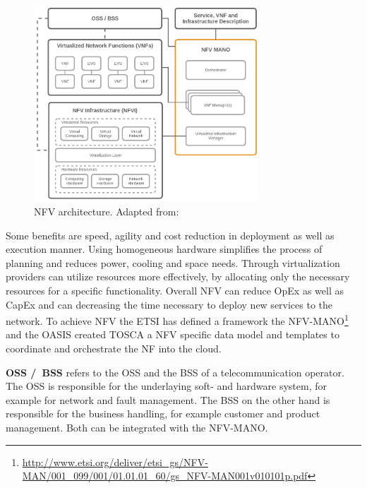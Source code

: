 \begin{figure}[H]
    \centering
    \includegraphics[width=0.75\textwidth]{resources/images/nfv_architecture.png}
    \caption[NFV architecture]{NFV architecture. Adapted from: \autocite{NFV:Architecture}}
    \label{fig:nfv_architecture}
\end{figure}

Some benefits are speed, agility and cost reduction in deployment as well as execution manner.\cite[cf.]{Noble:2015}
Using homogeneous hardware simplifies the process of planning and reduces power, cooling and space needs.\cite[cf.]{Noble:2015}
Through virtualization providers can utilize resources more effectively, by allocating only the necessary resources for a specific functionality.\cite[cf.]{Noble:2015}
Overall \ac{NFV} can reduce \ac{OpEx} as well as \ac{CapEx} and can decreasing the time necessary to deploy new services to the network.\cite[cf.]{Noble:2015}
To achieve \ac{NFV} the \ac{ETSI} has defined a framework the \ac{NFV-MANO}\footnote{\url{http://www.etsi.org/deliver/etsi_gs/NFV-MAN/001_099/001/01.01.01_60/gs_NFV-MAN001v010101p.pdf}} and the \ac{OASIS} created \ac{TOSCA} a \ac{NFV} specific data model and templates to coordinate and orchestrate the \ac{NF} into the cloud.

\textbf{\acs{OSS} /\ \acs{BSS}} refers to the \ac{OSS} and the \ac{BSS} of a telecommunication operator.\cite[cf.]{Kahn:2015}
The \ac{OSS} is responsible for the underlaying soft- and hardware system, for example for network and fault management.
The \ac{BSS} on the other hand is responsible for the business handling, for example customer and product management.
Both can be integrated with the \ac{NFV-MANO}.\cite[cf.]{Kahn:2015}

